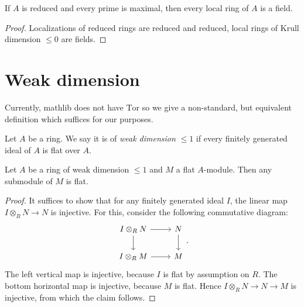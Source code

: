\begin{lemma}
    If $A$ is reduced and every prime is maximal, then every local ring of $A$ is a field.
    \label{lemma:reduced-prime-maximal-field}
    \leanok
\end{lemma}

\begin{proof}
    \leanok
    Localizations of reduced rings are reduced and reduced, local rings of Krull dimension $\le 0$
    are fields.
\end{proof}

\section{Weak dimension}

Currently, mathlib does not have $\mathrm{Tor}$ so we give a non-standard, but equivalent definition which
suffices for our purposes.

\begin{definition}
    Let $A$ be a ring. We say it is of \emph{weak dimension} $\le 1$ if every finitely generated ideal of
    $A$ is flat over $A$.
    \label{def:weak-dim-le-one}
    \leanok
\end{definition}

\begin{lemma}[\stacksproject{092S}, (2) => (4)]
    Let $A$ be a ring of weak dimension $\le 1$ and $M$ a flat $A$-module. Then
    any submodule of $M$ is flat.
    \label{lemma:weak-dim-flat-submodule}
    \leanok
\end{lemma}

\begin{proof}
    \leanok
    It suffices to show that for any finitely generated ideal $I$, the
    linear map $I \otimes_{R} N \to N$ is injective. For this, consider the following commutative
    diagram:
    \[
    \begin{tikzcd}
        I \otimes_{R} N \arrow{r} \arrow{d} & N \arrow{d} \\
        I \otimes_{R} M \arrow{r} & M
    \end{tikzcd}
    .\]
    The left vertical map is injective, because $I$ is flat by assumption on $R$. The bottom horizontal
    map is injective, because $M$ is flat. Hence $I \otimes_{R} N \to N \to M$ is injective,
    from which the claim follows.
\end{proof}

